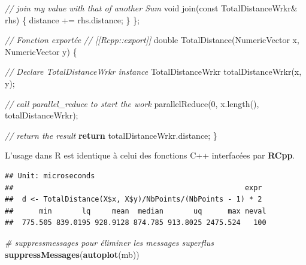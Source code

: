\documentclass[
  12pt,
  french,
  a4paper,
  extrafontsizes,onecolumn,openright
  ]{memoir}
\newenvironment{Shaded}{\begin{snugshade}}{\end{snugshade}}
\newcommand{\AttributeTok}[1]{\textcolor[rgb]{0.77,0.63,0.00}{#1}}
\newcommand{\CommentTok}[1]{\textcolor[rgb]{0.56,0.35,0.01}{\textit{#1}}}
\newcommand{\ControlFlowTok}[1]{\textcolor[rgb]{0.13,0.29,0.53}{\textbf{#1}}}
\newcommand{\DataTypeTok}[1]{\textcolor[rgb]{0.13,0.29,0.53}{#1}}
\newcommand{\DecValTok}[1]{\textcolor[rgb]{0.00,0.00,0.81}{#1}}
\newcommand{\KeywordTok}[1]{\textcolor[rgb]{0.13,0.29,0.53}{\textbf{#1}}}
\newcommand{\NormalTok}[1]{#1}
\newcommand{\OperatorTok}[1]{\textcolor[rgb]{0.81,0.36,0.00}{\textbf{#1}}}
\newcommand{\StringTok}[1]{\textcolor[rgb]{0.31,0.60,0.02}{#1}}
\newlength{\rf}
\begin{document}
\begin{Shaded}
\begin{Highlighting}[]
  \CommentTok{// join my value with that of another Sum}
  \DataTypeTok{void}\NormalTok{ join(}\AttributeTok{const}\NormalTok{ TotalDistanceWrkr& rhs) \{ }
\NormalTok{    distance += rhs.distance; }
\NormalTok{  \}}
\NormalTok{\};}


\CommentTok{// Fonction exportée}
\CommentTok{// [[Rcpp::export]]}
\DataTypeTok{double}\NormalTok{ TotalDistance(NumericVector x, NumericVector y) \{}
  
  \CommentTok{// Declare TotalDistanceWrkr instance}
\NormalTok{  TotalDistanceWrkr totalDistanceWrkr(x, y);}
  
  \CommentTok{// call parallel_reduce to start the work}
\NormalTok{  parallelReduce(}\DecValTok{0}\NormalTok{, x.length(), totalDistanceWrkr);}
  
  \CommentTok{// return the result}
  \ControlFlowTok{return}\NormalTok{ totalDistanceWrkr.distance;}
\NormalTok{\}}
\end{Highlighting}
\end{Shaded}

\normalsize

L'usage dans R est identique à celui des fonctions C++ interfacées par \textbf{RCpp}.

\scriptsize

\begin{Shaded}
\end{Shaded}

\begin{verbatim}
## Unit: microseconds
##                                                      expr
##  d <- TotalDistance(X$x, X$y)/NbPoints/(NbPoints - 1) * 2
##      min       lq     mean  median       uq      max neval
##  775.505 839.0195 928.9128 874.785 913.8025 2475.524   100
\end{verbatim}

\begin{Shaded}
\begin{Highlighting}[]
\CommentTok{# suppressmessages pour éliminer les messages superflus}
\KeywordTok{suppressMessages}\NormalTok{(}\KeywordTok{autoplot}\NormalTok{(mb))}
\end{Highlighting}
\end{Shaded}
\end{document}
